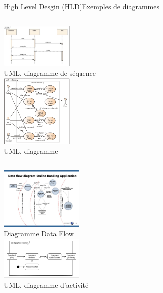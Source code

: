 \documentclass{beamer}
\begin{document}
    \begin{frame}{High Level Desgin (HLD)}{Exemples de diagrammes}
        \begin{columns}
            \centering
            \includegraphics[width=3.5cm]{image/uml-sequence-diagram} \\ UML, diagramme de séquence \\
            \centering
            \includegraphics[width=3.5cm]{image/uml-use-case-diagram} \\ UML, diagramme  \\
        \end{columns}
        \begin{columns}
            \centering
            \includegraphics[width=4cm]{image/data-flow-diagramm-online-banking-application} \\ Diagramme Data Flow \\
            \centering
            \includegraphics[width=4cm]{image/uml-activity-diagram} \\ UML, diagramme d'activité \\
        \end{columns}
    \end{frame}
\end{document}
